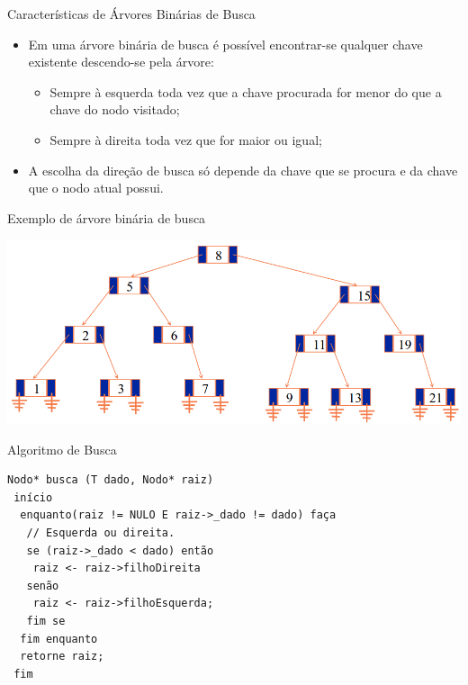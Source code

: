 \documentclass[12pt,table,xcolor={dvipsnames}]{beamer}
\begin{document}
\begin{frame}[fragile]{Características de Árvores Binárias de Busca}
          \begin{itemize}
          \item Em uma árvore binária de busca é possível encontrar-se qualquer chave existente descendo-se pela árvore:
          \begin{itemize}
          \item Sempre à esquerda toda vez que a chave procurada for menor do que a chave do nodo visitado;
          \item Sempre à direita toda vez que for maior ou igual;
          \end{itemize}
          \item A escolha da direção de busca só depende da chave que se procura e da chave que o nodo atual possui.
       	  \end{itemize}
\end{frame}



\begin{frame}[fragile]{Exemplo de árvore binária de busca}
\begin{center}
\includegraphics[scale=.3]{arv1.png} 
\end{center}
\end{frame}

\begin{frame}[fragile]{Algoritmo de Busca}
          \begin{lstlisting}
Nodo* busca (T dado, Nodo* raiz)
 início
  enquanto(raiz != NULO E raiz->_dado != dado) faça
   // Esquerda ou direita.
   se (raiz->_dado < dado) então
    raiz <- raiz->filhoDireita
   senão
    raiz <- raiz->filhoEsquerda;
   fim se
  fim enquanto
  retorne raiz;
 fim
 \end{lstlisting}
\end{frame} 
\end{document}
